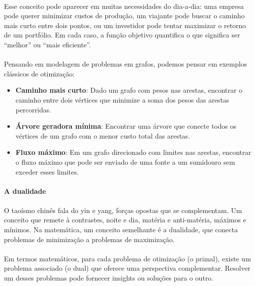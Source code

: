 \documentclass[12pt,a4paper]{article}
\def\emph#1{#1}%
\begin{document}
\paragraph{}
Esse conceito pode aparecer em muitas necessidades do dia-a-dia: uma empresa pode querer minimizar custos de produção, um viajante pode buscar o caminho mais curto entre dois pontos, ou um investidor pode tentar maximizar o retorno de um portfólio. Em cada caso, a função objetivo quantifica o que significa ser “melhor” ou “mais eficiente”.

\paragraph{}
Pensando em modelagem de problemas em grafos, podemos pensar em exemplos clássicos de otimização:

\begin{itemize}
    \item \textbf{Caminho mais curto}: Dado um grafo com pesos nas arestas, encontrar o caminho entre dois vértices que minimize a soma dos pesos das arestas percorridas.
    \item \textbf{Árvore geradora mínima}: Encontrar uma árvore que conecte todos os vértices de um grafo com o menor custo total das arestas.
    \item \textbf{Fluxo máximo}: Em um grafo direcionado com limites nas arestas, encontrar o fluxo máximo que pode ser enviado de uma fonte a um sumidouro sem exceder esses limites.
\end{itemize}

\paragraph{A dualidade}

\paragraph{}
O taoísmo chinês fala do yin e yang, forças opostas que se complementam. Um conceito que remete à contrastes, noite e dia, matéria e anti-matéria, máximos e mínimos. Na matemática, um conceito semelhante é a \emph{dualidade}, que conecta problemas de minimização a problemas de maximização.

\paragraph{}
Em termos matemáticos, para cada problema de otimização (o \emph{primal}), existe um problema associado (o \emph{dual}) que oferece uma perspectiva complementar. Resolver um desses problemas pode fornecer insights ou soluções para o outro.
\end{document}
